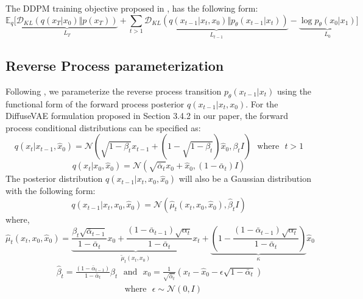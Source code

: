 \documentclass[10pt]{article} \usepackage[accepted]{tmlr}
\begin{document}
\noindent
The DDPM training objective proposed in \citep{ho2020denoising}, has the following form:
\begin{equation}
\mathbb{E}_q\Bigg[\underbrace{\mathcal{D}_{KL}\left(q(x_T|x_0) \Vert p(x_T)\right)}_{L_T} + \sum_{t>1}\underbrace{\mathcal{D}_{KL}(q(x_{t-1}|x_t, x_0) \Vert p_{\theta}(x_{t-1}|x_t))}_{L_{t-1}} - \underbrace{\log{p_{\theta}(x_0|x_1)}}_{L_0}\Bigg]
\end{equation}
\subsection{Reverse Process parameterization} 

Following \citep{ho2020denoising}, we parameterize the reverse process transition $p_{\theta}(x_{t-1}|x_t)$ using the functional form of the forward process posterior $q(x_{t-1}|x_t, x_0)$. For the DiffuseVAE formulation proposed in Section 3.4.2 in our paper, the forward process conditional distributions can be specified as:
\begin{equation}
    q(x_t|x_{t-1}, \hat{x}_0) = \mathcal{N}\left(\sqrt{1 - \beta_t} x_{t-1} + (1 - \sqrt{1 - \beta_t})\hat{x}_0, \beta_t I\right) \:\:\: \text{where} \:\:\: t > 1
\end{equation}
\begin{equation}
    q(x_t|x_0, \hat{x}_0) = \mathcal{N}\left(\sqrt{\bar{\alpha}_t} x_0 + \hat{x}_0, (1-\bar{\alpha}_t)I\right)
    \label{eqn:marg_form2_app}
\end{equation}
The posterior distribution $q(x_{t-1}|x_t, x_0, \hat{x}_0)$ will also be a Gaussian distribution with the following form:
\begin{equation}
    q(x_{t-1}|x_t, x_0, \hat{x}_0) = \mathcal{N}(\hat{\mu}_{t}(x_t, x_0, \hat{x}_0), \hat{\beta}_tI)
\end{equation}
where,
\begin{equation}
    \hat{\mu}_{t}(x_t, x_0, \hat{x}_0) = \underbrace{\frac{\beta_t\sqrt{\bar{\alpha}_{t-1}}}{1 - \bar{\alpha}_t}x_0 + \frac{(1 - \bar{\alpha}_{t-1})\sqrt{\alpha_t}}{1-\bar{\alpha}_t}x_t}_{\tilde{\mu}_t(x_t, x_0)} + \underbrace{(1 - \frac{(1 - \bar{\alpha}_{t-1})\sqrt{\alpha_t}}{1-\bar{\alpha}_t})}_{\kappa}\hat{x}_0
    \label{eqn:fwd_post}
\end{equation}
\begin{equation}
\begin{split}
    &\hat{\beta}_t = \frac{(1 - \bar{\alpha}_{t-1})}{1-\bar{\alpha}_t}\beta_t \:\:\: \text{and} \:\:\: x_0 = \frac{1}{\sqrt{\bar{\alpha}_t}} (x_t - \hat{x}_0 - \epsilon \sqrt{1 - \bar{\alpha}_t}) \:\:\: \\ & \qquad \qquad \qquad \qquad \text{where} \:\:\:  \epsilon \sim \mathcal{N}(0, I)
\end{split}
\end{equation}
\end{document}
